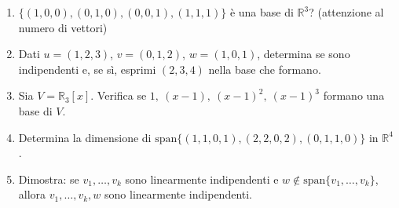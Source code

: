 \documentclass[a4paper,11pt]{article}
\begin{document}
\begin{enumerate}
  \item $\{(1,0,0),(0,1,0),(0,0,1),(1,1,1)\}$ è una base di $\mathbb R^3$? (attenzione al numero di vettori)
  \item Dati $u=(1,2,3)$, $v=(0,1,2)$, $w=(1,0,1)$, determina se sono indipendenti e, se sì, esprimi $(2,3,4)$ nella base che formano.
  \item Sia $V=\mathbb R_3[x]$. Verifica se $1,\ (x-1),\ (x-1)^2,\ (x-1)^3$ formano una base di $V$.
  \item Determina la dimensione di $\mathrm{span}\{(1,1,0,1),(2,2,0,2),(0,1,1,0)\}$ in $\mathbb R^4$.
  \item Dimostra: se $v_1,\dots,v_k$ sono linearmente indipendenti e $w\notin\mathrm{span}\{v_1,\dots,v_k\}$, allora $v_1,\dots,v_k,w$ sono linearmente indipendenti.
\end{enumerate}

\end{document}
